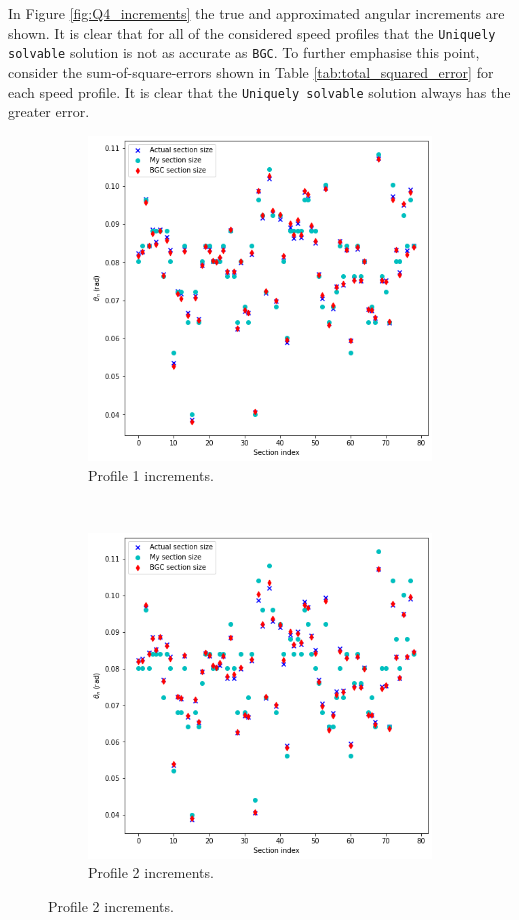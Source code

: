 \documentclass{article}
\begin{document}
	In Figure \ref{fig:Q4_increments} the true and approximated angular increments are shown. It is clear that for all of the considered speed profiles that the \texttt{Uniquely solvable} solution is not as accurate as \texttt{BGC}. To further emphasise this point, consider the sum-of-square-errors shown in Table \ref{tab:total_squared_error} for each speed profile. It is clear that the \texttt{Uniquely solvable} solution always has the greater error.
	\begin{figure}[htb!]
		\centering
		\begin{subfigure}[b]{0.45\textwidth}
			\centering
			\includegraphics[width=\textwidth]{Q4_f1_4.png}
			\caption{Profile 1 increments.}
		\end{subfigure}
		~
		\begin{subfigure}[b]{0.45\textwidth}
			\centering
			\includegraphics[width=\textwidth]{Q4_f2_4.png}
			\caption{Profile 2 increments.}
		\end{subfigure}
		

\end{figure}
\end{document}
